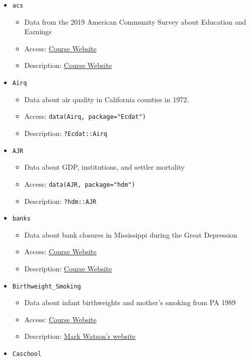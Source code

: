 \documentclass[
  letterpaper,
  DIV=11,
  numbers=noendperiod]{scrreprt}
\begin{document}
\begin{itemize}
\item
  \texttt{acs}

  \begin{itemize}
  \item
    Data from the 2019 American Community Survey about Education and
    Earnings
  \item
    Access:
    \href{http://bcallaway11.github.io/Courses/ECON_4750_Fall_2023/}{Course
    Website}
  \item
    Description:
    \href{http://bcallaway11.github.io/Courses/ECON_4750_Fall_2023/}{Course
    Website}
  \end{itemize}
\item
  \texttt{Airq}

  \begin{itemize}
  \item
    Data about air quality in California counties in 1972.
  \item
    Access: \texttt{data(Airq,\ package="Ecdat")}
  \item
    Description: \texttt{?Ecdat::Airq}
  \end{itemize}
\item
  \texttt{AJR}

  \begin{itemize}
  \item
    Data about GDP, institutions, and settler mortality
  \item
    Access: \texttt{data(AJR,\ package="hdm")}
  \item
    Description: \texttt{?hdm::AJR}
  \end{itemize}
\item
  \texttt{banks}

  \begin{itemize}
  \item
    Data about bank closures in Mississippi during the Great Depression
  \item
    Access:
    \href{http://bcallaway11.github.io/Courses/ECON_4750_Fall_2023/}{Course
    Website}
  \item
    Description:
    \href{http://bcallaway11.github.io/Courses/ECON_4750_Fall_2023/}{Course
    Website}
  \end{itemize}
\item
  \texttt{Birthweight\_Smoking}

  \begin{itemize}
  \item
    Data about infant birthweights and mother's smoking from PA 1989
  \item
    Access:
    \href{http://bcallaway11.github.io/Courses/ECON_4750_Fall_2023/}{Course
    Website}
  \item
    Description:
    \href{https://www.princeton.edu/~mwatson/Stock-Watson_3u/Students/EE_Datasets/Birthweight_Smoking_Description.pdf}{Mark
    Watson's website}
  \end{itemize}
\item
  \texttt{Caschool}


\end{itemize}
\end{document}
